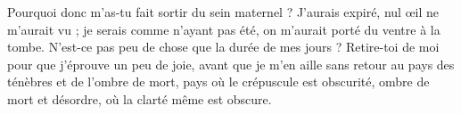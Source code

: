 Pourquoi donc m’as-tu fait sortir du sein maternel ? J’aurais expiré, nul œil ne m’aurait vu ;
je serais comme n’ayant pas été, on m’aurait porté du ventre à la tombe.
N’est-ce pas peu de chose que la durée de mes jours ? Retire-toi de moi pour que j’éprouve un peu de joie,
avant que je m’en aille sans retour au pays des ténèbres et de l’ombre de mort,
pays où le crépuscule est obscurité, ombre de mort et désordre, où la clarté même est obscure.
